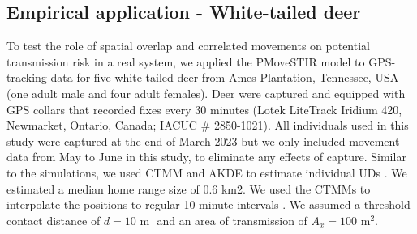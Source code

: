 \documentclass[letterpaper]{article}
\begin{document}


\subsection*{Empirical application - White-tailed deer}

To test the role of spatial overlap and correlated movements on potential transmission risk in a real system, we applied the PMoveSTIR model to GPS-tracking data for five white-tailed deer from Ames Plantation, Tennessee, USA (one adult male and four adult females). 
Deer were captured and equipped with GPS collars that recorded fixes every 30 minutes (Lotek LiteTrack Iridium 420, Newmarket, Ontario, Canada; IACUC \# 2850-1021).  All individuals used in this study were captured at the end of March 2023 but we only included movement data from May to June in this study, to eliminate any effects of capture. Similar to the simulations, we used CTMM and AKDE to estimate individual UDs \citep{Calabrese2016}. We estimated a median home range size of 0.6 km2.  We used the CTMMs to interpolate the positions to regular 10-minute intervals \citep{Yang2023}. We assumed a threshold contact distance of $d = 10 \text{ m }$ and an area of transmission of $A_x = 100 \text{ m}^2$.
\end{document}
